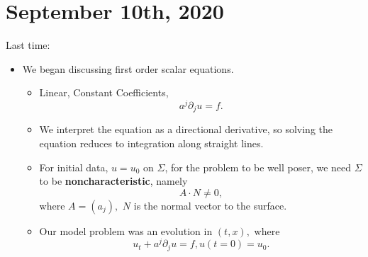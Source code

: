 \documentclass[12pt]{scrartcl}
\begin{document}
\section{September 10th, 2020}
Last time:
\begin{itemize}
\item We began discussing first order scalar equations.  
\begin{itemize}
\item Linear, Constant Coefficients, 
$$a^j \partial_j u = f.$$
\item We interpret the equation as a directional derivative, so solving the equation reduces to integration along straight lines.
\item For initial data, $u = u_0$ on $\Sigma$, for the problem to be well poser, we need $\Sigma$ to be \textbf{noncharacteristic}, namely 
$$A \cdot N \ne 0,$$
where $A = (a_j),$ $N$ is the normal vector to the surface.
\item Our model problem was an evolution in $(t, x),$ where $$u_t + a^j\partial_j u = f, u(t=0) = u_0.$$
\end{itemize}
\end{itemize}
\end{document}
